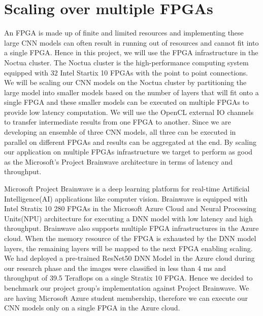 \documentclass[titlepage]{report}
\begin{document}
\section{Scaling over multiple FPGAs}
An FPGA is made up of finite and limited resources and implementing these large CNN models can often result in running out of resources and cannot fit into a single FPGA. Hence in this project, we will use the FPGA infrastructure in the Noctua cluster. The Noctua cluster is the high-performance computing system equipped with 32 Intel Startix 10 FPGAs with the point to point connections. We will be scaling our CNN models on the Noctua cluster by partitioning the large model into smaller models based on the number of layers that will fit onto a single FPGA and these smaller models can be executed on multiple FPGAs to provide low latency computation. We will use the OpenCL external IO channels to transfer intermediate results from one FPGA to another. Since we are developing an ensemble of three CNN models, all three can be executed in parallel on different FPGAs and results can be aggregated at the end. By scaling our application on multiple FPGAs infrastructure we target to perform as good as the Microsoft's Project Brainwave architecture in terms of latency and throughput. \par
Microsoft Project Brainwave is a deep learning platform for real-time Artificial Intelligence(AI) applications like computer vision. Brainwave is equipped with Intel Stratix 10 280 FPGAs in the Microsoft Azure Cloud and Neural Processing Units(NPU) architecture for executing a DNN model with low latency and high throughput. Brainwave also supports multiple FPGA infrastructures in the Azure cloud. When the memory resource of the FPGA is exhausted by the DNN model layers, the remaining layers will be mapped to the next FPGA enabling scaling. We had deployed a pre-trained ResNet50 DNN Model in the Azure cloud during our research phase and the images were classified in less than 4 ms and throughput of 39.5 Teraflops on a single Stratix 10 FPGA. Hence we decided to benchmark our project group's implementation against Project Brainwave. We are having Microsoft Azure student membership, therefore we can execute our CNN models only on a single FPGA in the Azure cloud.
\end{document}
